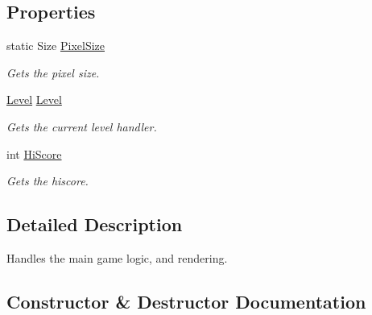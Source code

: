 \subsection*{Properties}
\begin{DoxyCompactItemize}
\item 
static Size \mbox{\hyperlink{class_o_e_invaders_1_1_logic_1_1_game_logic_ab40522da929d33c56ee807a1f4684130}{Pixel\+Size}}
\begin{DoxyCompactList}\small\item\em Gets the pixel size. \end{DoxyCompactList}\item 
\mbox{\hyperlink{class_o_e_invaders_1_1_logic_1_1_level}{Level}} \mbox{\hyperlink{class_o_e_invaders_1_1_logic_1_1_game_logic_a4c3e508d67e5db33e093db266180203f}{Level}}
\begin{DoxyCompactList}\small\item\em Gets the current level handler. \end{DoxyCompactList}\item 
int \mbox{\hyperlink{class_o_e_invaders_1_1_logic_1_1_game_logic_a1c36b6c1080b6f8342251e63724b90c0}{Hi\+Score}}
\begin{DoxyCompactList}\small\item\em Gets the hiscore. \end{DoxyCompactList}\end{DoxyCompactItemize}


\subsection{Detailed Description}
Handles the main game logic, and rendering. 



\subsection{Constructor \& Destructor Documentation}
\mbox{\label{class_o_e_invaders_1_1_logic_1_1_game_logic_a238d378cb79529c74d2c704dbfb85a6c}} 
